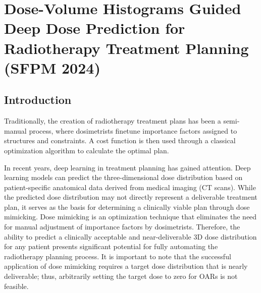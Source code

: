 \section[DVH Guided Deep Dose]{Dose-Volume Histograms Guided Deep Dose Prediction for Radiotherapy Treatment Planning (SFPM 2024)}
\subsection{Introduction}
Traditionally, the creation of radiotherapy treatment plans has been a semi-manual process, where dosimetrists finetune importance factors assigned to structures and constraints.
A cost function is then used through a classical optimization algorithm to calculate the optimal plan.

In recent years, deep learning in treatment planning has gained attention.
Deep learning models can predict the three-dimensional dose distribution based on patient-specific anatomical data derived from medical imaging (CT scans).
While the predicted dose distribution may not directly represent a deliverable treatment plan, it serves as the basis for determining a clinically viable plan through dose mimicking.
Dose mimicking is an optimization technique that eliminates the need for manual adjustment of importance factors by dosimetrists.
Therefore, the ability to predict a clinically acceptable and near-deliverable 3D dose distribution for any patient presents significant potential for fully automating the radiotherapy planning process.
It is important to note that the successful application of dose mimicking requires a target dose distribution that is nearly deliverable; thus, arbitrarily setting the target dose to zero for OARs is not feasible.


